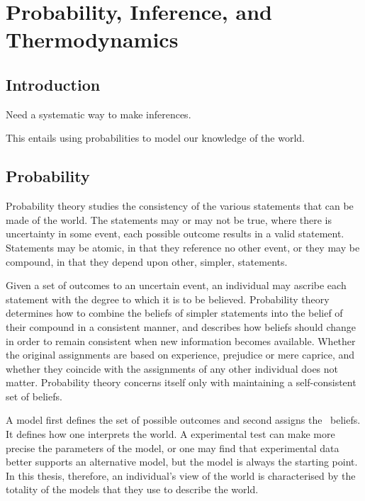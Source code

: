 
\chapter{Probability, Inference, and Thermodynamics}{\label{sec:variationalMethods}

\section{Introduction}

Need a systematic way to make inferences.

This entails using probabilities to model our knowledge of the world.



\section{Probability}



Probability theory studies the consistency of the various statements that can be made of the world.
The statements may or may not be true,
where there is uncertainty in some event, 
each possible outcome results in a valid statement.
Statements may be atomic, in that they reference no other event,
or they may be compound, in that they depend upon other, simpler, statements.

Given a set of outcomes to an uncertain event, 
an individual may ascribe each statement with the degree to which it is to be believed.
Probability theory determines how to combine the beliefs of simpler statements
into the belief of their compound in a consistent manner,
and describes how beliefs should change in order to remain consistent when new information becomes available.
Whether the original assignments are based on experience, prejudice or mere caprice,
and whether they coincide with the assignments of any other individual does not matter.
Probability theory concerns itself only with maintaining a self-consistent set of beliefs.


A model first defines the set of possible outcomes and second assigns the \apriori\ beliefs.
It defines  how one interprets the world.
A experimental test can make more precise the parameters of the model,
or one may find that experimental data better supports an alternative model,
but the model is always the starting point.
In this thesis, therefore, an individual's view of the world is characterised by the totality of the models that they use to describe the world.

}
